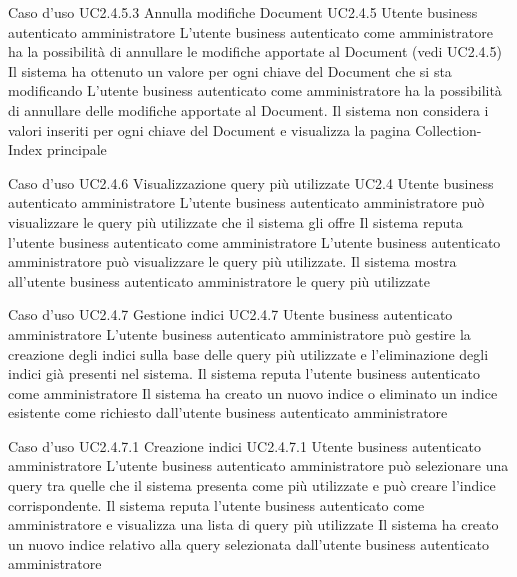 \UCtitle
{Caso d'uso UC2.4.5.3}
{Annulla modifiche Document}
\UC
{UC2.4.5}
{Utente business autenticato amministratore}
{L'utente business autenticato come amministratore ha la possibilità di annullare le modifiche apportate al Document (vedi UC2.4.5)}
{Il sistema ha ottenuto un valore per ogni chiave del Document che si sta modificando}
\scenario
{L'utente business autenticato come amministratore ha la possibilità di annullare delle modifiche apportate al Document.}
\post
{Il sistema non considera i valori inseriti per ogni chiave del Document e visualizza la pagina Collection-Index principale}

\UCtitle
{Caso d'uso UC2.4.6}
{Visualizzazione query più utilizzate}
\UC
{UC2.4}
{Utente business autenticato amministratore}
{L'utente business autenticato amministratore può visualizzare le query più utilizzate che il sistema gli offre}
{Il sistema reputa l'utente business autenticato come amministratore}
\scenario
{L'utente business autenticato amministratore può visualizzare le query più utilizzate.}
\post
{Il sistema mostra all'utente business autenticato amministratore le query più utilizzate}

\UCtitle
{Caso d'uso UC2.4.7}
{Gestione indici}
\UC
{UC2.4.7}
{Utente business autenticato amministratore}
{L'utente business autenticato amministratore può gestire la creazione degli indici sulla base delle query più utilizzate e l'eliminazione degli indici già presenti nel sistema.}
{Il sistema reputa l'utente business autenticato come amministratore}
\post
{Il sistema ha creato un nuovo indice o eliminato un indice esistente come richiesto dall'utente business autenticato amministratore}

\UCtitle
{Caso d'uso UC2.4.7.1}
{Creazione indici}
\UC
{UC2.4.7.1}
{Utente business autenticato amministratore}
{L'utente business autenticato amministratore può selezionare una query tra quelle che il sistema presenta come più utilizzate e può creare l'indice corrispondente.}
{Il sistema reputa l'utente business autenticato come amministratore e visualizza una lista di query più utilizzate}
\post
{Il sistema ha creato un nuovo indice relativo alla query selezionata dall'utente business autenticato amministratore}

